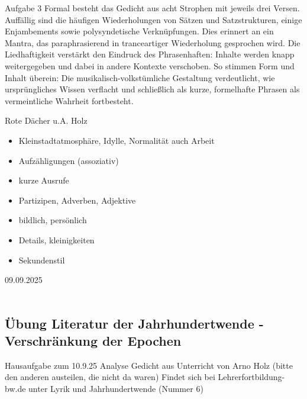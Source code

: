 \documentclass[11pt,a4paper,oneside]{article}
\newcommand{\lessondate}[1]{\noindent\hfill\textcolor{MarginalGray}{\textsc{#1}}\\\vspace{0.5cm}}
\begin{document}
	\begin{loesung}{Aufgabe 3}
	Formal besteht das Gedicht aus acht Strophen mit jeweils drei Versen. Auffällig sind die häufigen Wiederholungen von Sätzen und Satzstrukturen, einige Enjambements sowie polysyndetische Verknüpfungen. Dies erinnert an ein Mantra, das paraphrasierend in tranceartiger Wiederholung gesprochen wird. Die Liedhaftigkeit verstärkt den Eindruck des Phrasenhaften: Inhalte werden knapp weitergegeben und dabei in andere Kontexte verschoben. So stimmen Form und Inhalt überein: Die musikalisch-volkstümliche Gestaltung verdeutlicht, wie ursprüngliches Wissen verflacht und schließlich als kurze, formelhafte Phrasen als vermeintliche Wahrheit fortbesteht.
	\end{loesung}
	
	
	\newpage
	
	
	Rote Dächer u.A. Holz 
	
	\begin{itemize}
		\item Kleinstadtatmosphäre, Idylle, Normalität auch Arbeit 
		\item Aufzähligungen (assoziativ)
		\item kurze Ausrufe 
		\item Partizipen, Adverben, Adjektive 
		\item bildlich, persönlich 
		\item Details, kleinigkeiten 
		\item Sekundenstil 
	\end{itemize}
	
	
	\newpage
	
	\lessondate{09.09.2025}\\
	
	\subsection{Übung Literatur der Jahrhundertwende - Verschränkung der Epochen}
	
	\begin{aufgabe}{Hausaufgabe zum 10.9.25}
	Analyse Gedicht aus Unterricht von Arno Holz (bitte den anderen austeilen, die nicht da waren)
	Findet sich bei Lehrerfortbildung-bw.de unter Lyrik und Jahrhundertwende (Nummer 6)
	\end{aufgabe}
	
\end{document}
